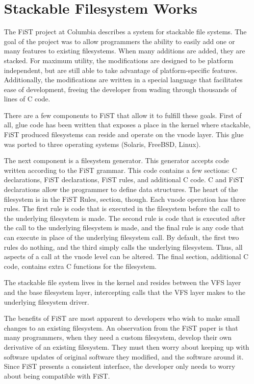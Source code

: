 \section{Stackable Filesystem Works}

The FiST project at Columbia describes a system for stackable file
systems. The goal of the project was to allow programmers the ability
to easily add one or many features to existing filesystems. When many
additions are added, they are stacked. For maximum utility, the
modifications are designed to be platform independent, but are still
able to take advantage of platform-specific features. Additionally,
the modifications are written in a special language that facilitates
ease of development, freeing the developer from wading through
thousands of lines of C code.

There are a few components to FiST that allow it to fulfill these
goals. First of all, glue code has been written that exposes a place
in the kernel where stackable, FiST produced filesystems can reside
and operate on the vnode layer. This glue was ported to three
operating systems (Solaris, FreeBSD, Linux).

The next component is a filesystem generator. This generator accepts
code written according to the FiST grammar. This code contains a few
sections: C declarations, FiST declarations, FiST rules, and
additional C code. C and FiST declarations allow the programmer to
define data structures. The heart of the filesystem is in the FiST
Rules, section, though. Each vnode operation has three rules. The
first rule is code that is executed in the filesystem before the call
to the underlying filesystem is made. The second rule is code that is
executed after the call to the underlying filesystem is made, and the
final rule is any code that can execute in place of the underlying
filesystem call. By default, the first two rules do nothing, and the
third simply calls the underlying filesystem. Thus, all aspects of a
call at the vnode level can be altered. The final section, additional
C code, contains extra C functions for the filesystem.

The stackable file system lives in the kernel and resides between the
VFS layer and the base filesystem layer, intercepting calls that the
VFS layer makes to the underlying filesystem driver.

The benefits of FiST are most apparent to developers who wish to make
small changes to an existing filesystem. An observation from the FiST
paper is that many programmers, when they need a custom filesystem,
develop their own derivative of an existing filesystem. They must then
worry about keeping up with software updates of original software they
modified, and the software around it. Since FiST presents a consistent
interface, the developer only needs to worry about being compatible
with FiST.


